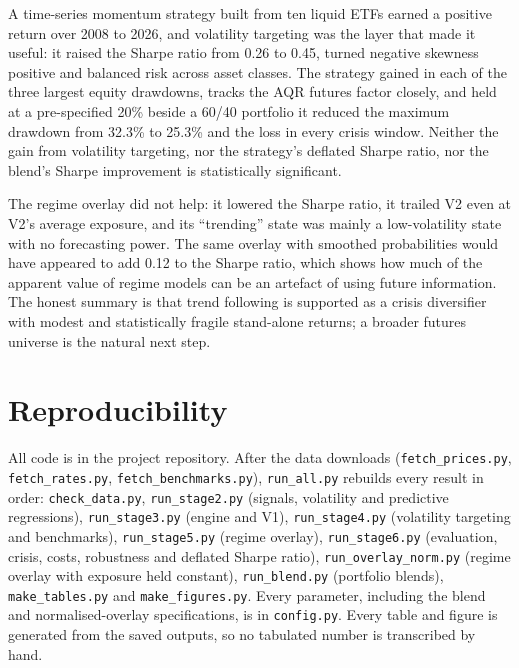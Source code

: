 \documentclass[11pt,a4paper]{article}
\begin{document}
A time-series momentum strategy built from ten liquid ETFs earned a positive return over 2008 to 2026, and volatility targeting was the layer that made it useful: it raised the Sharpe ratio from 0.26 to 0.45, turned negative skewness positive and balanced risk across asset classes. The strategy gained in each of the three largest equity drawdowns, tracks the AQR futures factor closely, and held at a pre-specified 20\% beside a 60/40 portfolio it reduced the maximum drawdown from 32.3\% to 25.3\% and the loss in every crisis window. Neither the gain from volatility targeting, nor the strategy's deflated Sharpe ratio, nor the blend's Sharpe improvement is statistically significant.

The regime overlay did not help: it lowered the Sharpe ratio, it trailed V2 even at V2's average exposure, and its ``trending'' state was mainly a low-volatility state with no forecasting power. The same overlay with smoothed probabilities would have appeared to add 0.12 to the Sharpe ratio, which shows how much of the apparent value of regime models can be an artefact of using future information. The honest summary is that trend following is supported as a crisis diversifier with modest and statistically fragile stand-alone returns; a broader futures universe is the natural next step.

\section*{Reproducibility}

{\raggedright
All code is in the project repository. After the data downloads (\texttt{fetch\_prices.py}, \texttt{fetch\_rates.py}, \texttt{fetch\_benchmarks.py}), \texttt{run\_all.py} rebuilds every result in order: \texttt{check\_data.py}, \texttt{run\_stage2.py} (signals, volatility and predictive regressions), \texttt{run\_stage3.py} (engine and V1), \texttt{run\_stage4.py} (volatility targeting and benchmarks), \texttt{run\_stage5.py} (regime overlay), \texttt{run\_stage6.py} (evaluation, crisis, costs, robustness and deflated Sharpe ratio), \texttt{run\_overlay\_norm.py} (regime overlay with exposure held constant), \texttt{run\_blend.py} (portfolio blends), \texttt{make\_tables.py} and \texttt{make\_figures.py}. Every parameter, including the blend and normalised-overlay specifications, is in \texttt{config.py}. Every table and figure is generated from the saved outputs, so no tabulated number is transcribed by hand.\par}
\end{document}
